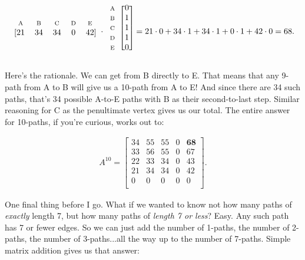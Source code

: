 \[
\begin{blockarray}{ccccc}
{\scriptsize\textrm{A}} & {\scriptsize\textrm{B}} & {\scriptsize\textrm{C}} & {\scriptsize\textrm{D}} & {\scriptsize\textrm{E}} \\
\begin{block}{[ccccc]}
 21 & 34 & 34 & 0 & 42 \\
\end{block}
\end{blockarray} \cdot
\begin{blockarray}{cc}
\begin{block}{c[c]}
{\scriptsize\textrm{A}} & 0 \\
{\scriptsize\textrm{B}} & 1 \\
{\scriptsize\textrm{C}} & 1 \\
{\scriptsize\textrm{D}} & 1 \\
{\scriptsize\textrm{E}} & 0 \\
\end{block}
\end{blockarray} = 21\cdot 0 + 34\cdot 1 + 34\cdot 1 + 0\cdot 1 + 42\cdot 0 =
68.
\]
\vspace{-.20in}

Here's the rationale. We can get from B directly to E. That means that any
9-path from A to B will give us a 10-path from A to E! And since there are 34
such paths, that's 34 possible A-to-E paths with B as their second-to-last
step. Similar reasoning for C as the penultimate vertex gives us our total. The
entire answer for 10-paths, if you're curious, works out to:

\vspace{-.25in}
\begin{align*}
A^{10} =
\begin{bmatrix}
34 & 55 & 55 &  0 & \textbf{68} \\
33 & 56 & 55 &  0 & 67 \\
22 & 33 & 34 &  0 & 43 \\
21 & 34 & 34 &  0 & 42 \\
 0 &  0 &  0 &  0 &  0 \\
\end{bmatrix}.
\end{align*}
\vspace{-.15in}

\bigskip

One final thing before I go. What if we wanted to know not how many paths of
\textit{exactly} length 7, but how many paths of \textit{length 7 or less}?
Easy. Any such path has 7 or fewer edges. So we can just add the number of
1-paths, the number of 2-paths, the number of 3-paths...all the way up to the
number of 7-paths. Simple matrix addition gives us that answer:

